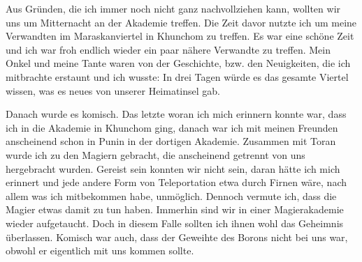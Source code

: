 Aus Gründen, die ich immer noch nicht ganz nachvollziehen kann, wollten wir uns um Mitternacht an der Akademie treffen. Die Zeit davor nutzte ich um meine Verwandten im Maraskanviertel in Khunchom zu treffen. Es war eine schöne Zeit und ich war froh endlich wieder ein paar nähere Verwandte zu treffen. Mein Onkel und meine Tante waren von der Geschichte, bzw. den Neuigkeiten, die ich mitbrachte erstaunt und ich wusste: In drei Tagen würde es das gesamte Viertel wissen, was es neues von unserer Heimatinsel gab.

Danach wurde es komisch. Das letzte woran ich mich erinnern konnte war, dass ich in die Akademie in Khunchom ging, danach war ich mit meinen Freunden anscheinend schon in Punin in der dortigen Akademie. Zusammen mit Toran wurde ich zu den Magiern gebracht, die anscheinend getrennt von uns hergebracht wurden. Gereist sein konnten wir nicht sein, daran hätte ich mich erinnert und jede andere Form von Teleportation etwa durch Firnen wäre, nach allem was ich mitbekommen habe, unmöglich. Dennoch vermute ich, dass die Magier etwas damit zu tun haben. Immerhin sind wir in einer Magierakademie wieder aufgetaucht. Doch in diesem Falle sollten ich ihnen wohl das Geheimnis überlassen. Komisch war auch, dass der Geweihte des Borons nicht bei uns war, obwohl er eigentlich mit uns kommen sollte. 

